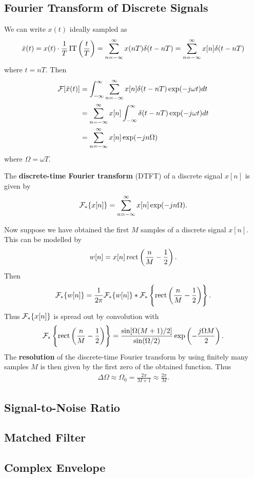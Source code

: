 \documentclass{memoir}
\begin{document}
\subsection{Fourier Transform of Discrete Signals}
We can write $x(t)$ ideally sampled as
\begin{align*}
    \tilde{x}(t) = x(t) \cdot \frac{1}{T}\operatorname{IT}\left(\frac{t}{T}\right) = \sum_{n=-\infty}^{\infty} x(nT) \delta(t - nT) = \sum_{n=-\infty}^{\infty} x[n] \delta(t - nT)
\end{align*}
where $t = nT$. Then
\begin{align*}
    \mathcal{F}[\tilde{x}(t)] &= \int_{-\infty}^{\infty} \sum_{n=-\infty}^{\infty} x[n] \delta(t - nT) \exp(-j \omega t) dt \\
    &= \sum_{n=-\infty}^{\infty} x[n] \int_{-\infty}^{\infty}  \delta(t - nT) \exp(-j \omega t) dt \\
    &= \sum_{n=-\infty}^{\infty} x[n] \exp(-j n \Omega)
\end{align*}
where $\Omega = \omega T$.
\begin{definition}
    The \textbf{discrete-time Fourier transform} (DTFT) of a discrete signal $x[n]$ is given by
    \begin{align*}
        \mathcal{F}_*\{x[n]\} = \sum_{n=-\infty}^{\infty} x[n] \exp(-j n \Omega).
    \end{align*}
\end{definition}
Now suppose we have obtained the first $M$ samples of a discrete signal $x[n]$. This can be modelled by
\begin{align*}
    w[n] = x[n]\operatorname{rect}\left(\frac{n}{M} - \frac{1}{2}\right).
\end{align*}
Then
\begin{align*}
    \mathcal{F}_*\{w[n]\} = \frac{1}{2 \pi} \mathcal{F}_*\{w[n]\} \ast \mathcal{F}_*\left\{\operatorname{rect}\left(\frac{n}{M} - \frac{1}{2}\right)\right\}.
\end{align*}
Thus $\mathcal{F}_*\{x[n]\}$ is spread out by convolution with
\begin{align*}
    \mathcal{F}_*\left\{\operatorname{rect}\left(\frac{n}{M} - \frac{1}{2}\right)\right\} = \frac{\sin[\Omega(M+1)/2]}{\sin(\Omega/2)}\exp\left(-\frac{j \Omega M}{2}\right).
\end{align*}
The \textbf{resolution} of the discrete-time Fourier transform by using finitely many samples $M$ is then given by the first zero of the obtained function. Thus
\begin{align*}
    \Delta \Omega \approx \Omega_0 = \frac{2 \pi}{M+1} \approx \frac{2 \pi}{M}.
\end{align*}

\subsection{Signal-to-Noise Ratio}

\subsection{Matched Filter}

\subsection{Complex Envelope}
\end{document}
